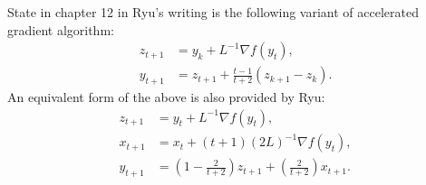         \begin{definition}[AG Ryu 12.1]
        \label{def:ag_ryu_12.1}
            State in chapter 12 in Ryu's writing \cite{ryu_large-scale_2022} is the following variant of accelerated gradient algorithm: 
            \begin{align*}
                z_{t + 1} &= y_k + L^{-1}\nabla f(y_t), 
                \\
                y_{t + 1} &= z_{t + 1} + \frac{t - 1}{t + 2}\left(
                    z_{k + 1} - z_k
                \right). 
            \end{align*}
            An equivalent form of the above is also provided by Ryu: 
            \begin{align*}
                z_{t + 1} &= y_t + L^{-1}\nabla f(y_t), 
                \\
                x_{t + 1} &= x_t + (t + 1)(2L)^{-1}\nabla f(y_t), 
                \\
                y_{t + 1} &= \left(
                    1 - \frac{2}{t + 2} 
                \right)z_{t + 1} + 
                \left(
                    \frac{2}{t + 2}
                \right)x_{t + 1}. 
            \end{align*}
        \end{definition}
